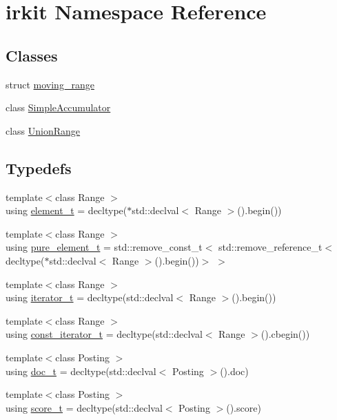 \hypertarget{namespaceirkit}{}\section{irkit Namespace Reference}
\label{namespaceirkit}
\subsection*{Classes}
\begin{DoxyCompactItemize}
\item 
struct \hyperlink{structirkit_1_1moving__range}{moving\+\_\+range}
\item 
class \hyperlink{classirkit_1_1SimpleAccumulator}{Simple\+Accumulator}
\item 
class \hyperlink{classirkit_1_1UnionRange}{Union\+Range}
\end{DoxyCompactItemize}
\subsection*{Typedefs}
\begin{DoxyCompactItemize}
\item 
{\footnotesize template$<$class Range $>$ }\\using \hyperlink{namespaceirkit_a40deb8b0d47ecaada4b47270b97d5469}{element\+\_\+t} = decltype($\ast$std\+::declval$<$ Range $>$().begin())
\item 
{\footnotesize template$<$class Range $>$ }\\using \hyperlink{namespaceirkit_afcffab67300c5c703cb38a363c9a6f1d}{pure\+\_\+element\+\_\+t} = std\+::remove\+\_\+const\+\_\+t$<$ std\+::remove\+\_\+reference\+\_\+t$<$ decltype($\ast$std\+::declval$<$ Range $>$().begin())$>$ $>$
\item 
{\footnotesize template$<$class Range $>$ }\\using \hyperlink{namespaceirkit_af390a50be8f636e7239c650e5043c56f}{iterator\+\_\+t} = decltype(std\+::declval$<$ Range $>$().begin())
\item 
{\footnotesize template$<$class Range $>$ }\\using \hyperlink{namespaceirkit_a4b1668583041117eb42c1b5a1091b804}{const\+\_\+iterator\+\_\+t} = decltype(std\+::declval$<$ Range $>$().cbegin())
\item 
{\footnotesize template$<$class Posting $>$ }\\using \hyperlink{namespaceirkit_a595d83053e112c98ab2a1b65e5dd74be}{doc\+\_\+t} = decltype(std\+::declval$<$ Posting $>$().doc)
\item 
{\footnotesize template$<$class Posting $>$ }\\using \hyperlink{namespaceirkit_a754dabe3346f950c948e7596d9d46c71}{score\+\_\+t} = decltype(std\+::declval$<$ Posting $>$().score)
\end{DoxyCompactItemize}
